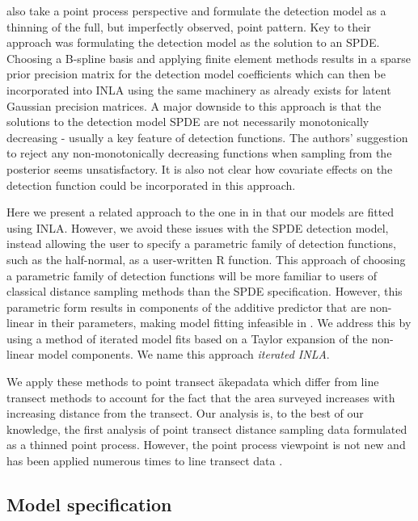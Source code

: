 \documentclass[preprint,12pt]{elsarticle}
\newcommand{\akepa}{\textquotesingle\={a}kepa}  %
\begin{document}
\citet{yuan_point_2017} also take a point process perspective and formulate the detection model as a thinning of the full, but imperfectly observed, point pattern.  Key to their approach was formulating the detection model as the solution to an SPDE.  Choosing a B-spline basis and applying finite element methods results in a sparse prior precision matrix for the detection model coefficients which can then be incorporated into INLA using the same machinery as already exists for latent Gaussian precision matrices.  A major downside to this approach is that the solutions to the detection model SPDE are not necessarily monotonically decreasing - usually a key feature of detection functions.  The authors' suggestion to reject any non-monotonically decreasing functions when sampling from the posterior seems unsatisfactory.  It is also not clear how covariate effects on the detection function could be incorporated in this approach.  

Here we present a related approach to the one in \citet{yuan_point_2017} in that our models are fitted using INLA.  However, we avoid these issues with the SPDE detection model, instead allowing the user to specify a parametric family of detection functions, such as the half-normal, as a user-written R function.  This approach of choosing a parametric family of detection functions will be more familiar to users of classical distance sampling methods than the SPDE specification.  However, this parametric form results in components of the additive predictor that are non-linear in their parameters, making model fitting infeasible in .  We address this by using a method of iterated model fits based on a Taylor expansion of the non-linear model components.  We name this approach \textit{iterated INLA}.  

We apply these methods to point transect \akepa data which differ from line transect methods to account for the fact that the area surveyed increases with increasing distance from the transect.  Our analysis is, to the best of our knowledge, the first analysis of point transect distance sampling data formulated as a thinned point process.  However, the point process viewpoint is not new and has been applied numerous times to line transect data \citep{buckland_model-based_2016, johnson_model-based_2010, hedley_spatial_2004,  hogmander_random_1991, stoyan_remark_1982, waagepetersen_likelihood-based_2006}.  

\subsection{Model specification}
\end{document}

